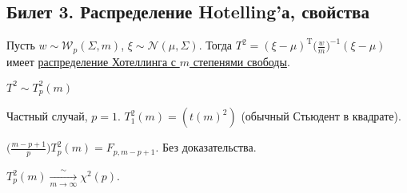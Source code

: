 \subsection{Билет 3. Распределение Hotelling'а, свойства}
\begin{dfn}
Пусть $w \sim \mathcal{W}_p (\Sigma, m)$, $\xi \sim \mathcal{N}(\mu,\Sigma)$. Тогда $T^2 = (\xi - \mu)^{\mathrm{T}} \Big ( \frac{w}{m} \Big )^{-1} (\xi - \mu)$ имеет \underline{распределение Хотеллинга с $m$ степенями свободы}.
\end{dfn}
\begin{design}
$T^2 \sim T_p^2 (m)$
\end{design}
\begin{prop}[1]
Частный случай, $p = 1$. $T_1^2 (m) = (t(m)^2)$ (обычный Стьюдент в квадрате).
\end{prop}
\begin{prop}[2]
$\Big (\frac{m - p + 1}{p} \Big )T_p^2 (m) = F_{p,m-p+1}$. Без доказательства.
\end{prop}
\begin{prop}[3]
$T_p^2 (m) \xrightarrow[m \rightarrow \infty]{\sim} \chi^2 (p)$.
\end{prop}
